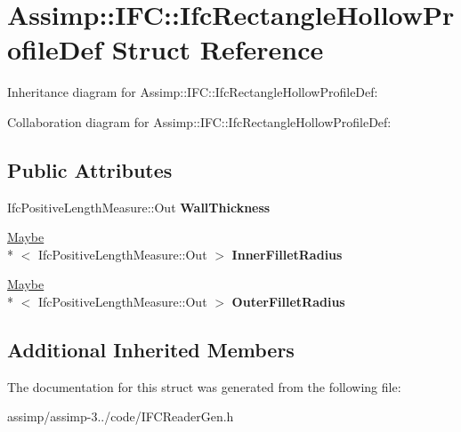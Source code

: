 \hypertarget{struct_assimp_1_1_i_f_c_1_1_ifc_rectangle_hollow_profile_def}{\section{Assimp\+:\+:I\+F\+C\+:\+:Ifc\+Rectangle\+Hollow\+Profile\+Def Struct Reference}
\label{struct_assimp_1_1_i_f_c_1_1_ifc_rectangle_hollow_profile_def}
}


Inheritance diagram for Assimp\+:\+:I\+F\+C\+:\+:Ifc\+Rectangle\+Hollow\+Profile\+Def\+:


Collaboration diagram for Assimp\+:\+:I\+F\+C\+:\+:Ifc\+Rectangle\+Hollow\+Profile\+Def\+:
\subsection*{Public Attributes}
\begin{DoxyCompactItemize}
\item 
\hypertarget{struct_assimp_1_1_i_f_c_1_1_ifc_rectangle_hollow_profile_def_ab5bae07b4ed7b261cc1bd0be1b41f0e4}{Ifc\+Positive\+Length\+Measure\+::\+Out {\bfseries Wall\+Thickness}}\label{struct_assimp_1_1_i_f_c_1_1_ifc_rectangle_hollow_profile_def_ab5bae07b4ed7b261cc1bd0be1b41f0e4}

\item 
\hypertarget{struct_assimp_1_1_i_f_c_1_1_ifc_rectangle_hollow_profile_def_a2933c4a9319b659216da1ac2523d45b0}{\hyperlink{struct_assimp_1_1_s_t_e_p_1_1_maybe}{Maybe}\\*
$<$ Ifc\+Positive\+Length\+Measure\+::\+Out $>$ {\bfseries Inner\+Fillet\+Radius}}\label{struct_assimp_1_1_i_f_c_1_1_ifc_rectangle_hollow_profile_def_a2933c4a9319b659216da1ac2523d45b0}

\item 
\hypertarget{struct_assimp_1_1_i_f_c_1_1_ifc_rectangle_hollow_profile_def_a777ed74041ad09a5d8e95fa80a062a66}{\hyperlink{struct_assimp_1_1_s_t_e_p_1_1_maybe}{Maybe}\\*
$<$ Ifc\+Positive\+Length\+Measure\+::\+Out $>$ {\bfseries Outer\+Fillet\+Radius}}\label{struct_assimp_1_1_i_f_c_1_1_ifc_rectangle_hollow_profile_def_a777ed74041ad09a5d8e95fa80a062a66}

\end{DoxyCompactItemize}
\subsection*{Additional Inherited Members}


The documentation for this struct was generated from the following file\+:\begin{DoxyCompactItemize}
\item 
assimp/assimp-\/3../code/I\+F\+C\+Reader\+Gen.\+h\end{DoxyCompactItemize}

